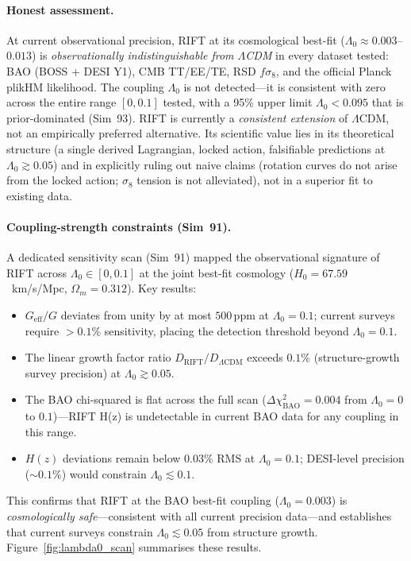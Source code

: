\documentclass[12pt,a4paper]{article}
\begin{document}
\paragraph{Honest assessment.}
At current observational precision, RIFT at its cosmological best-fit
($\Lambda_0 \approx 0.003$--$0.013$) is \emph{observationally indistinguishable
from $\Lambda$CDM} in every dataset tested: BAO (BOSS + DESI Y1), CMB TT/EE/TE,
RSD $f\sigma_8$, and the official Planck plikHM likelihood.  The coupling
$\Lambda_0$ is not detected---it is consistent with zero across the entire
range $[0, 0.1]$ tested, with a 95\% upper limit $\Lambda_0 < 0.095$ that
is prior-dominated (Sim~93).  RIFT is currently a \emph{consistent extension}
of $\Lambda$CDM, not an empirically preferred alternative.  Its scientific
value lies in its theoretical structure (a single derived Lagrangian, locked
action, falsifiable predictions at $\Lambda_0 \gtrsim 0.05$) and in explicitly
ruling out naive claims (rotation curves do not arise from the locked action;
$\sigma_8$ tension is not alleviated), not in a superior fit to existing data.

\paragraph{Coupling-strength constraints (Sim~91).}
A dedicated sensitivity scan (Sim~91) mapped the observational signature of RIFT
across $\Lambda_0 \in [0, 0.1]$ at the joint best-fit cosmology
($H_0 = 67.59$~km/s/Mpc, $\Omega_m = 0.312$). Key results:
\begin{itemize}
  \item $G_{\mathrm{eff}}/G$ deviates from unity by at most $500\,\mathrm{ppm}$ at $\Lambda_0 = 0.1$; current surveys require $> 0.1\%$ sensitivity, placing the detection threshold beyond $\Lambda_0 = 0.1$.
  \item The linear growth factor ratio $D_{\mathrm{RIFT}}/D_{\Lambda\mathrm{CDM}}$ exceeds $0.1\%$ (structure-growth survey precision) at $\Lambda_0 \gtrsim 0.05$.
  \item The BAO chi-squared is flat across the full scan ($\Delta\chi^2_{\mathrm{BAO}} = 0.004$ from $\Lambda_0 = 0$ to $0.1$)---RIFT H(z) is undetectable in current BAO data for any coupling in this range.
  \item $H(z)$ deviations remain below $0.03\%$ RMS at $\Lambda_0 = 0.1$; DESI-level precision ($\sim 0.1\%$) would constrain $\Lambda_0 \lesssim 0.1$.
\end{itemize}
This confirms that RIFT at the BAO best-fit coupling ($\Lambda_0 = 0.003$) is
\emph{cosmologically safe}---consistent with all current precision data---and
establishes that current surveys constrain $\Lambda_0 \lesssim 0.05$ from
structure growth. Figure~\ref{fig:lambda0_scan} summarises these results.
\end{document}

